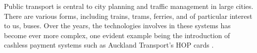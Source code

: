 \documentclass[12pt,a4paper]{article}
\begin{document}














Public transport is central to city planning and traffic management in large cities.
There are various forms, including trains, trams, ferries, and of particular interest to us, buses.
Over the years, the technologies involves in these systems has become ever more complex,
one evident example being the introduction of cashless payment systems such as Auckland Transport's HOP cards \citep{cn}.
\end{document}
